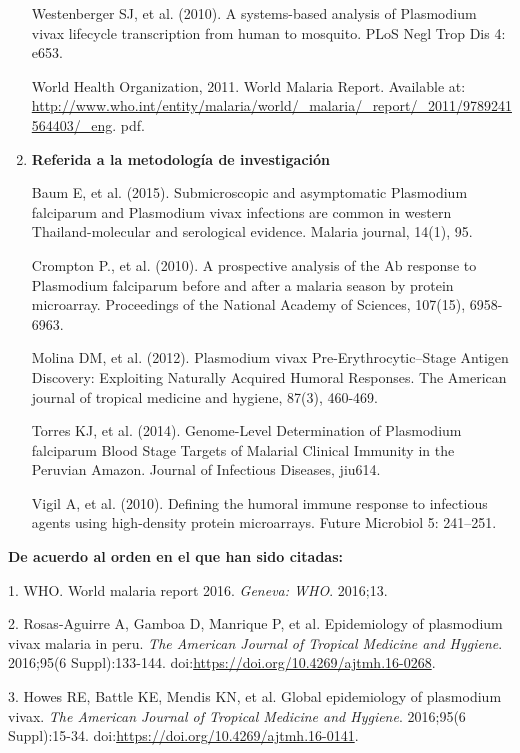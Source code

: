 \documentclass[]{article}
\begin{document}
\begin{enumerate}
  Westenberger SJ, et al. (2010). A systems-based analysis of Plasmodium
  vivax lifecycle transcription from human to mosquito. PLoS Negl Trop
  Dis 4: e653.

  World Health Organization, 2011. World Malaria Report. Available at:
  \url{http://www.who.int/entity/malaria/world/_malaria/_report/_2011/9789241564403/_eng}.
  pdf.
\item
  \textbf{Referida a la metodología de investigación}

  Baum E, et al. (2015). Submicroscopic and asymptomatic Plasmodium
  falciparum and Plasmodium vivax infections are common in western
  Thailand-molecular and serological evidence. Malaria journal, 14(1),
  95.

  Crompton P., et al. (2010). A prospective analysis of the Ab response
  to Plasmodium falciparum before and after a malaria season by protein
  microarray. Proceedings of the National Academy of Sciences, 107(15),
  6958-6963.

  Molina DM, et al. (2012). Plasmodium vivax Pre-Erythrocytic--Stage
  Antigen Discovery: Exploiting Naturally Acquired Humoral Responses.
  The American journal of tropical medicine and hygiene, 87(3), 460-469.

  Torres KJ, et al. (2014). Genome-Level Determination of Plasmodium
  falciparum Blood Stage Targets of Malarial Clinical Immunity in the
  Peruvian Amazon. Journal of Infectious Diseases, jiu614.

  Vigil A, et al. (2010). Defining the humoral immune response to
  infectious agents using high-density protein microarrays. Future
  Microbiol 5: 241--251.
\end{enumerate}

\textbf{De acuerdo al orden en el que han sido citadas:}

\hypertarget{refs}{}
\hypertarget{ref-WHO2016world}{}
1. WHO. World malaria report 2016. \emph{Geneva: WHO}. 2016;13.

\hypertarget{ref-rosas2016peru}{}
2. Rosas-Aguirre A, Gamboa D, Manrique P, et al. Epidemiology of
plasmodium vivax malaria in peru. \emph{The American Journal of Tropical
Medicine and Hygiene}. 2016;95(6 Suppl):133-144.
doi:\href{https://doi.org/https://doi.org/10.4269/ajtmh.16-0268}{https://doi.org/10.4269/ajtmh.16-0268}.

\hypertarget{ref-howes2016global}{}
3. Howes RE, Battle KE, Mendis KN, et al. Global epidemiology of
plasmodium vivax. \emph{The American Journal of Tropical Medicine and
Hygiene}. 2016;95(6 Suppl):15-34.
doi:\href{https://doi.org/https://doi.org/10.4269/ajtmh.16-0141}{https://doi.org/10.4269/ajtmh.16-0141}.
\end{document}
